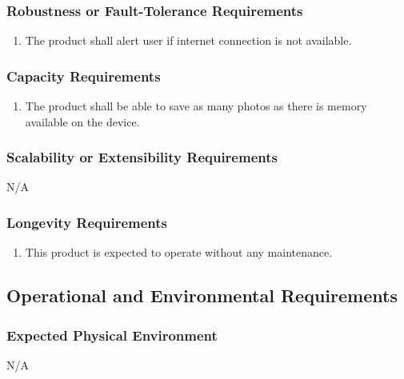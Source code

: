 \documentclass[]{article}
\begin{document}
\subsubsection{Robustness or Fault-Tolerance Requirements}
\label{ssub:robustness_or_fault_tolerance_requirements}
\begin{enumerate}[{PR}7. ]
	\item The product shall alert user if internet connection is not available.
\end{enumerate}

\subsubsection{Capacity Requirements}
\label{ssub:capacity_requirements}
\begin{enumerate}[{PR}8. ]
	\item The product shall be able to save as many photos as there is memory available on the device.
\end{enumerate}

\subsubsection{Scalability or Extensibility Requirements}
\label{ssub:scalability_or_extensibility_requirements}
N/A

\subsubsection{Longevity Requirements}
\label{ssub:longevity_requirements}
\begin{enumerate}[{PR}9. ]
	\item This product is expected to operate without any maintenance.
\end{enumerate}


\subsection{Operational and Environmental Requirements}
\label{sub:operational_and_environmental_requirements}

\subsubsection{Expected Physical Environment}
\label{ssub:expected_physical_environment}
N/A
\end{document}
